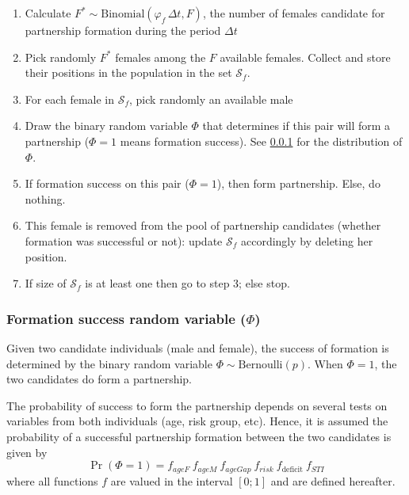 \documentclass[11pt, onecolumn]{article}
\begin{document}
\begin{enumerate}

\item Calculate $F^* \sim\text{Binomial}(\varphi_f\,\Delta t, F)$, the number of females  candidate for partnership formation during the period $\Delta t$
\item Pick randomly $F^*$ females among the $F$ available females. Collect and store their positions in the population in the set $\mathcal{S}_f$. 
\item For each female in $\mathcal{S}_f$, pick randomly an available male 
\item Draw the binary random variable $\Phi$ that determines if this pair will form a partnership ($\Phi=1$ means formation success). See \ref{formationSuccessFormula} for the  distribution of $\Phi$.
\item If formation success on this pair ($\Phi=1$), then form partnership. Else, do nothing.
\item This female is removed from the pool of partnership candidates (whether formation was successful or not): update $\mathcal{S}_f$ accordingly by deleting her position.
\item If size of $\mathcal{S}_f$ is at least one then go to step 3; else stop.
\end{enumerate}


\subsubsection{Formation success random variable ($\Phi$)}


\label{formationSuccessFormula}
Given two candidate individuals (male and female), the success of formation is determined by the binary random variable $\Phi\sim\mathrm{Bernoulli}(p)$. When $\Phi=1$, the two candidates do form a partnership.

The probability of success to form the partnership depends on several tests on variables from both individuals (age, risk group, etc). Hence, it is assumed the probability of a successful partnership formation between the two candidates is given by
\begin{equation}
\label{probaFormation}
\Pr(\Phi=1) = f_{ageF} \ f_{ageM}\ f_{ageGap}\ f_{risk}\ f_{\mathrm{deficit}}\ f_{STI}
\end{equation}
where all functions $f$ are valued in the interval $[0;1]$ and are defined hereafter.
\end{document}
